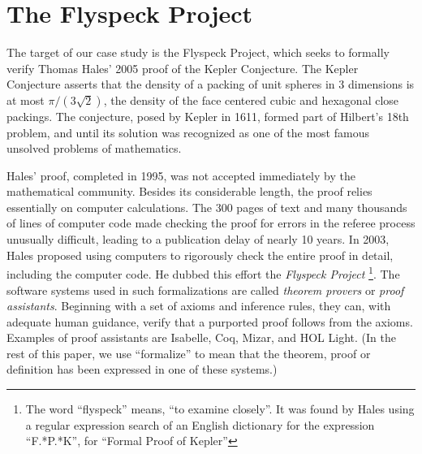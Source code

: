 
\section{The Flyspeck Project}
\label{sec:flyspeck}

\begin{figure}
  \centering
  \vspace{-.9cm}
  \vspace{-1.2cm}
\end{figure}


The target of our case study is the Flyspeck Project, which seeks to
formally verify Thomas Hales' 2005 proof of the Kepler Conjecture.
The Kepler Conjecture asserts that the density of a packing of unit
spheres in 3 dimensions is at most $\pi/(3\sqrt{2})$, the density of the face centered
cubic and hexagonal close packings.  The conjecture, posed by Kepler
in 1611, formed part of Hilbert's 18th problem, and until its solution
was recognized as one of the most famous unsolved problems of
mathematics.

Hales' proof, completed in 1995, was not accepted immediately by the mathematical community. 
Besides its considerable length,  the proof relies essentially on computer calculations.  
The 300 pages of text and many thousands of lines of computer code made
checking the proof for errors in the referee process unusually difficult,
leading to a publication delay of nearly 10 years.  
In 2003, Hales proposed using computers to rigorously check the entire proof in
detail, including the computer code.  He dubbed this
effort the \textit{Flyspeck Project}
\footnote{The word ``flyspeck'' means, ``to examine closely''.  It was found
by Hales using a regular expression search of an English dictionary for the
expression ``F.*P.*K'', for ``Formal Proof of Kepler''}.  
The software systems used in such formalizations are called \textit{theorem provers}
or \textit{proof assistants}.
Beginning with a set of axioms and inference rules, they can,
with adequate human guidance, verify that a purported proof follows from the axioms.  
Examples of proof assistants are Isabelle\cite{Paulson:1994:Isabelle}, 
Coq\cite{Bertot:2004:CoqBook}, Mizar\cite{mizarmanual},
and HOL Light\cite{Harrison:2000:HOL-Light}. (In the rest of this paper, we use ``formalize'' to mean
that the theorem, proof or definition has been expressed in one of these
systems.)

